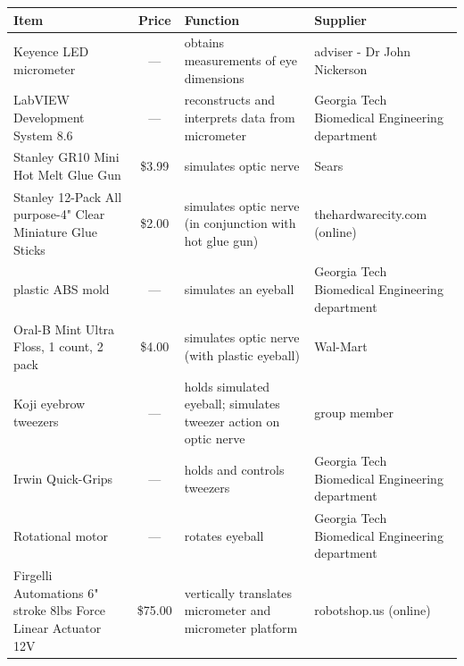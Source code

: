 \documentclass{article}
\begin{document}
\begin{table}[H]
  \footnotesize
  \centering
  \begin{tabularx}{\textwidth}{XcXX}
    \toprule
    \textbf{Item} & \textbf{Price} & \textbf{Function} & \textbf{Supplier} \\
    \hline
    Keyence LED micrometer                                          & ---      & obtains measurements of eye dimensions                            & adviser - Dr John Nickerson                    \\
    LabVIEW Development System 8.6                                  & ---      & reconstructs and interprets data from micrometer                  & Georgia Tech Biomedical Engineering department \\
    Stanley GR10 Mini Hot Melt Glue Gun                             & \$3.99   & simulates optic nerve                                             & Sears                                          \\
    Stanley 12-Pack All purpose-4" Clear Miniature Glue Sticks      & \$2.00   & simulates optic nerve (in conjunction with hot glue gun)          & thehardwarecity.com (online)                   \\
    plastic ABS mold                                                & ---      & simulates an eyeball                                              & Georgia Tech Biomedical Engineering department \\
    Oral-B Mint Ultra Floss, 1 count, 2 pack                        & \$4.00   & simulates optic nerve (with plastic eyeball)                      & Wal-Mart                                       \\
    Koji eyebrow tweezers                                           & ---      & holds simulated eyeball; simulates tweezer action on optic nerve  & group member                                   \\
    Irwin Quick-Grips                                               & ---      & holds and controls tweezers                                       & Georgia Tech Biomedical Engineering department \\
    Rotational motor                                                & ---      & rotates eyeball                                                   & Georgia Tech Biomedical Engineering department \\
    Firgelli Automations 6" stroke 8lbs Force Linear Actuator 12V   & \$75.00  & vertically translates micrometer and micrometer platform          & robotshop.us (online)                          \\

\end{tabularx}
\end{table}
\end{document}
